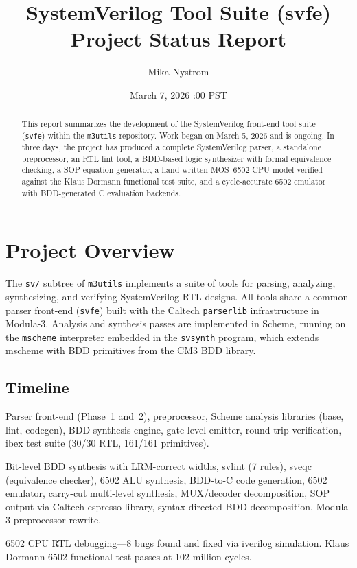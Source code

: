 \documentclass[11pt]{article}
\title{SystemVerilog Tool Suite (svfe)\\[4pt]
       \large Project Status Report}
\author{Mika Nystrom}
\date{March 7, 2026 \quad 09:00 PST}
\begin{document}
\maketitle

\begin{abstract}
This report summarizes the development of the SystemVerilog front-end
tool suite (\texttt{svfe}) within the \texttt{m3utils} repository.
Work began on March 5, 2026 and is ongoing.  In three days,
the project has produced a complete SystemVerilog parser,
a standalone preprocessor, an RTL lint tool, a BDD-based logic
synthesizer with formal equivalence checking, a SOP equation
generator, a hand-written MOS~6502 CPU model verified against the
Klaus Dormann functional test suite, and a cycle-accurate 6502
emulator with BDD-generated C evaluation backends.
\end{abstract}

\tableofcontents
\newpage

\section{Project Overview}

The \texttt{sv/} subtree of \texttt{m3utils} implements a suite of
tools for parsing, analyzing, synthesizing, and verifying
SystemVerilog RTL designs.  All tools share a common parser front-end
(\texttt{svfe}) built with the Caltech \texttt{parserlib}
infrastructure in Modula-3.  Analysis and synthesis passes are
implemented in Scheme, running on the \texttt{mscheme} interpreter
embedded in the \texttt{svsynth} program, which extends mscheme with
BDD primitives from the CM3 BDD library.

\subsection{Timeline}

\begin{description}[leftmargin=3cm,style=nextline]
\item[March 5] Parser front-end (Phase~1 and~2), preprocessor,
  Scheme analysis libraries (base, lint, codegen), BDD synthesis
  engine, gate-level emitter, round-trip verification, ibex test
  suite (30/30 RTL, 161/161 primitives).
\item[March 6] Bit-level BDD synthesis with LRM-correct widths,
  svlint (7 rules), sveqc (equivalence checker), 6502 ALU synthesis,
  BDD-to-C code generation, 6502 emulator, carry-cut multi-level
  synthesis, MUX/decoder decomposition, SOP output via Caltech
  espresso library, syntax-directed BDD decomposition, Modula-3
  preprocessor rewrite.
\item[March 7] 6502 CPU RTL debugging---8 bugs found and fixed via
  iverilog simulation.  Klaus Dormann 6502 functional test passes
  at 102 million cycles.
\end{description}
\end{document}
